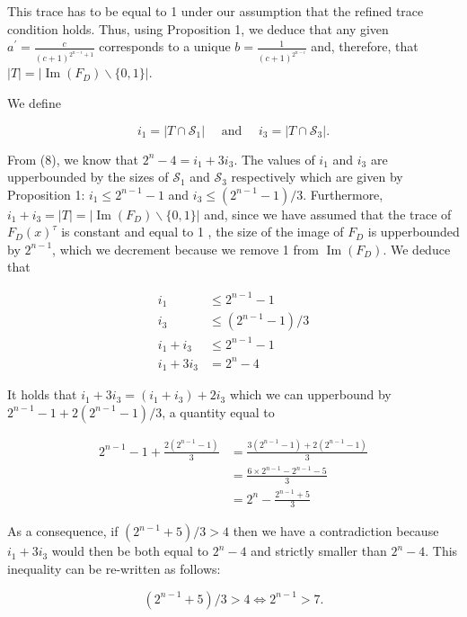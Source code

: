 \documentclass[10pt]{article}
\begin{document}
This trace has to be equal to 1 under our assumption that the refined trace condition holds. Thus, using Proposition 1, we deduce that any given $a^{\prime}=\frac{c}{(c+1)^{2^{n-i}+1}}$ corresponds to a unique $b=\frac{1}{(c+1)^{2^{n-i}}}$ and, therefore, that $|T|=\left|\operatorname{Im}\left(F_{D}\right) \backslash\{0,1\}\right|$.

We define

$$
i_{1}=\left|T \cap \mathcal{S}_{1}\right| \quad \text { and } \quad i_{3}=\left|T \cap \mathcal{S}_{3}\right| .
$$

From (8), we know that $2^{n}-4=i_{1}+3 i_{3}$. The values of $i_{1}$ and $i_{3}$ are upperbounded by the sizes of $\mathcal{S}_{1}$ and $\mathcal{S}_{3}$ respectively which are given by Proposition 1: $i_{1} \leq 2^{n-1}-1$ and $i_{3} \leq\left(2^{n-1}-1\right) / 3$. Furthermore, $i_{1}+i_{3}=|T|=\left|\operatorname{Im}\left(F_{D}\right) \backslash\{0,1\}\right|$ and, since we have assumed that the trace of $F_{D}(x)^{\tau}$ is constant and equal to 1 , the size of the image of $F_{D}$ is upperbounded by $2^{n-1}$, which we decrement because we remove 1 from $\operatorname{Im}\left(F_{D}\right)$. We deduce that

$$
\begin{aligned}
i_{1} & \leq 2^{n-1}-1 \\
i_{3} & \leq\left(2^{n-1}-1\right) / 3 \\
i_{1}+i_{3} & \leq 2^{n-1}-1 \\
i_{1}+3 i_{3} & =2^{n}-4
\end{aligned}
$$

It holds that $i_{1}+3 i_{3}=\left(i_{1}+i_{3}\right)+2 i_{3}$ which we can upperbound by $2^{n-1}-1+2\left(2^{n-1}-1\right) / 3$, a quantity equal to

$$
\begin{aligned}
2^{n-1}-1+\frac{2\left(2^{n-1}-1\right)}{3} & =\frac{3\left(2^{n-1}-1\right)+2\left(2^{n-1}-1\right)}{3} \\
& =\frac{6 \times 2^{n-1}-2^{n-1}-5}{3} \\
& =2^{n}-\frac{2^{n-1}+5}{3}
\end{aligned}
$$

As a consequence, if $\left(2^{n-1}+5\right) / 3>4$ then we have a contradiction because $i_{1}+3 i_{3}$ would then be both equal to $2^{n}-4$ and strictly smaller than $2^{n}-4$. This inequality can be re-written as follows:

$$
\left(2^{n-1}+5\right) / 3>4 \Leftrightarrow 2^{n-1}>7 .
$$
\end{document}
